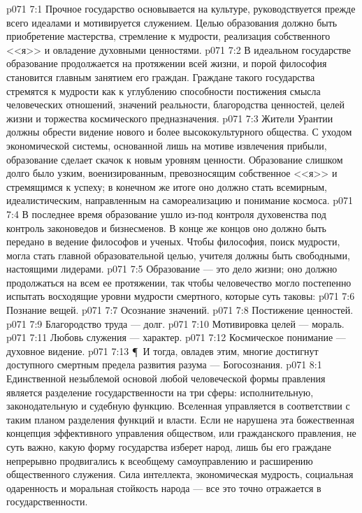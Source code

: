 \vs p071 7:1 Прочное государство основывается на культуре, руководствуется прежде всего идеалами и мотивируется служением. Целью образования должно быть приобретение мастерства, стремление к мудрости, реализация собственного <<я>> и овладение духовными ценностями.
\vs p071 7:2 В идеальном государстве образование продолжается на протяжении всей жизни, и порой философия становится главным занятием его граждан. Граждане такого государства стремятся к мудрости как к углублению способности постижения смысла человеческих отношений, значений реальности, благородства ценностей, целей жизни и торжества космического предназначения.
\vs p071 7:3 Жители Урантии должны обрести видение нового и более высококультурного общества. С уходом экономической системы, основанной лишь на мотиве извлечения прибыли, образование сделает скачок к новым уровням ценности. Образование слишком долго было узким, военизированным, превозносящим собственное <<я>> и стремящимся к успеху; в конечном же итоге оно должно стать всемирным, идеалистическим, направленным на самореализацию и понимание космоса.
\vs p071 7:4 В последнее время образование ушло из\hyp{}под контроля духовенства под контроль законоведов и бизнесменов. В конце же концов оно должно быть передано в ведение философов и ученых. Чтобы философия, поиск мудрости, могла стать главной образовательной целью, учителя должны быть свободными, настоящими лидерами.
\vs p071 7:5 Образование --- это дело жизни; оно должно продолжаться на всем ее протяжении, так чтобы человечество могло постепенно испытать восходящие уровни мудрости смертного, которые суть таковы:
\vs p071 7:6 \bibnobreakspace Познание вещей.
\vs p071 7:7 \bibnobreakspace Осознание значений.
\vs p071 7:8 \bibnobreakspace Постижение ценностей.
\vs p071 7:9 \bibnobreakspace Благородство труда --- долг.
\vs p071 7:10 \bibnobreakspace Мотивировка целей --- мораль.
\vs p071 7:11 \bibnobreakspace Любовь служения --- характер.
\vs p071 7:12 \bibnobreakspace Космическое понимание --- духовное видение.
\vs p071 7:13 \P\ И тогда, овладев этим, многие достигнут доступного смертным предела развития разума --- Богосознания.
\vs p071 8:1 Единственной незыблемой основой любой человеческой формы правления является разделение государственности на три сферы: исполнительную, законодательную и судебную функцию. Вселенная управляется в соответствии с таким планом разделения функций и власти. Если не нарушена эта божественная концепция эффективного управления обществом, или гражданского правления, не суть важно, какую форму государства изберет народ, лишь бы его граждане непрерывно продвигались к всеобщему самоуправлению и расширению общественного служения. Сила интеллекта, экономическая мудрость, социальная одаренность и моральная стойкость народа --- все это точно отражается в государственности.

